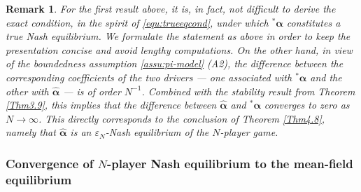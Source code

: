 \documentclass[10pt,a4paper]{article}
\newcommand{\Balpha}{\boldsymbol{\alpha}}
\newcommand{\hBalpha}{\hat{\Balpha}}
\theoremstyle{plain}
\newtheorem{Remark}[Theorem]{Remark}
\theoremstyle{definition}
\numberwithin{equation}{section}
\newcommand{\lps}[2]{{}^{#1}\!#2}
\begin{document}

\begin{Remark}
\label{rem:vepNE}
For the first result above, it is, in fact, not difficult to derive the exact condition, in the spirit of \eqref{equ:trueeqcond}, under which $\lps{*}\Balpha$ constitutes a true Nash equilibrium. We formulate the statement as above in order to keep the presentation concise and avoid lengthy computations. 
On the other hand, in view of the boundedness assumption \ref{assu:pi-model} \textnormal{(A2)}, the difference between the corresponding coefficients of the two drivers --- one associated with $\lps{*}\Balpha$ and the other with $\hBalpha$ --- is of order \(N^{-1}\). Combined with the stability result from Theorem \ref{Thm3.9}, this implies that the difference between $\hBalpha$ and $\lps{*}\Balpha$ converges to zero as \(N \to \infty\). This directly corresponds to the conclusion of Theorem \ref{Thm4.8}, namely that $\hBalpha$ is an \(\varepsilon_N\)-Nash equilibrium of the \(N\)-player game.
\end{Remark}

\subsubsection[Convergence of N-player Nash equilibrium to the mean-field equilibrium]{Convergence of $N$-player Nash equilibrium to the mean-field equilibrium}
\label{sec4.1.3}
\end{document}
